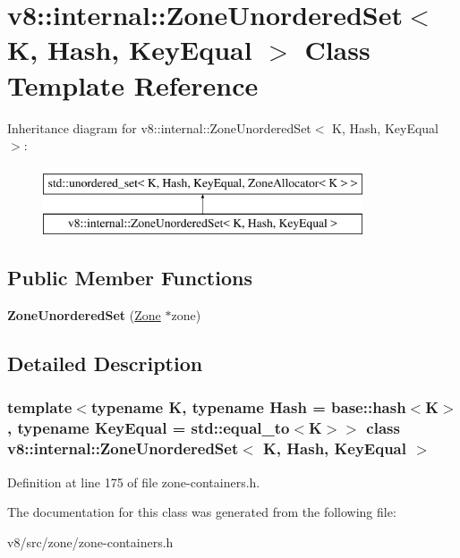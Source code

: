 \hypertarget{classv8_1_1internal_1_1ZoneUnorderedSet}{}\section{v8\+:\+:internal\+:\+:Zone\+Unordered\+Set$<$ K, Hash, Key\+Equal $>$ Class Template Reference}
\label{classv8_1_1internal_1_1ZoneUnorderedSet}
Inheritance diagram for v8\+:\+:internal\+:\+:Zone\+Unordered\+Set$<$ K, Hash, Key\+Equal $>$\+:\begin{figure}[H]
\begin{center}
\leavevmode
\includegraphics[height=2.000000cm]{classv8_1_1internal_1_1ZoneUnorderedSet}
\end{center}
\end{figure}
\subsection*{Public Member Functions}
\begin{DoxyCompactItemize}
\item 
\mbox{\label{classv8_1_1internal_1_1ZoneUnorderedSet_ae16f60b43eab678ec14cfbeb31e7f9a9}} 
{\bfseries Zone\+Unordered\+Set} (\mbox{\hyperlink{classv8_1_1internal_1_1Zone}{Zone}} $\ast$zone)
\end{DoxyCompactItemize}


\subsection{Detailed Description}
\subsubsection*{template$<$typename K, typename Hash = base\+::hash$<$\+K$>$, typename Key\+Equal = std\+::equal\+\_\+to$<$\+K$>$$>$\newline
class v8\+::internal\+::\+Zone\+Unordered\+Set$<$ K, Hash, Key\+Equal $>$}



Definition at line 175 of file zone-\/containers.\+h.



The documentation for this class was generated from the following file\+:\begin{DoxyCompactItemize}
\item 
v8/src/zone/zone-\/containers.\+h\end{DoxyCompactItemize}
